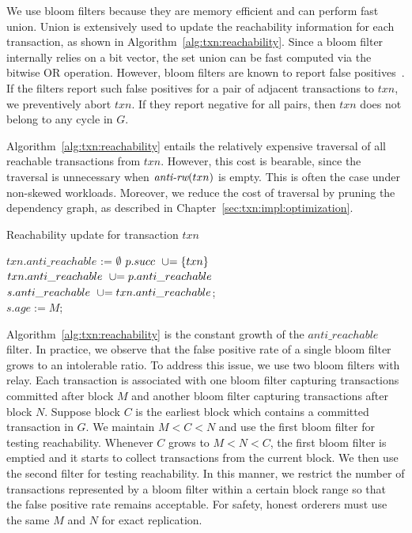 We use bloom filters because they are memory efficient and can perform
fast union.
%
Union is extensively used to update the reachability information for each
transaction, as shown in Algorithm~\ref{alg:txn:reachability}.
%
Since a bloom filter internally relies on a bit vector, the set union can be
fast computed via the bitwise OR operation.
%
However, bloom filters are known to report false positives~\cite{bloom1970space}.
%
If the filters report such false positives for a pair of adjacent transactions
to $txn$, we preventively abort $txn$.
%
If they report negative for all pairs, then $txn$ does not belong to any
cycle in $G$.

Algorithm~\ref{alg:txn:reachability} entails the relatively expensive traversal of all
reachable transactions from $txn$.
%
However, this cost is bearable, since the traversal is unnecessary when
$\textit{anti-rw}(txn)$ is empty.
%
This is often the case under non-skewed workloads.
%
Moreover, we reduce the cost of traversal by pruning the dependency graph, as described in Chapter~\ref{sec:txn:impl:optimization}.

\begin{algorithm}
  \caption{Reachability update for transaction $txn$}
  \label{alg:txn:reachability}

  $txn.anti\_reachable$ := $\emptyset$\;
   {
      $p.succ \ \mathrel{{\cup}{=}} \{txn\}$\;
      $txn.anti\_reachable \ \mathrel{{\cup}{=}}
      p.anti\_reachable$\; }
   {
      $s.anti\_reachable \ \mathrel{{\cup}{=}}
      txn.anti\_reachable$;\\
      $s.age := M$;\label{alg:txn:age}}
\end{algorithm}

Algorithm~\ref{alg:txn:reachability} is the constant growth of the
$anti\_reachable$ filter.
%
In practice, we observe that the false positive rate of a single bloom filter
grows to an intolerable ratio.
%
To address this issue, we use two bloom filters with relay.
%
Each transaction is associated with one bloom filter capturing transactions
committed after block $M$ and another bloom filter capturing transactions after
block $N$.
%
Suppose block $C$ is the earliest block which contains a committed transaction
in $G$.
%
We maintain $M < C < N$ and use the first bloom filter for testing reachability.
%
Whenever $C$ grows to $M < N < C$, the first bloom filter is emptied and it
starts to collect transactions from the current block.
%
We then use the second filter for testing reachability.
%
In this manner, we restrict the number of transactions represented by a bloom
filter within a certain block range so that the false positive rate remains
acceptable. 
%
For safety, honest orderers must use the same $M$ and $N$ for exact replication.



